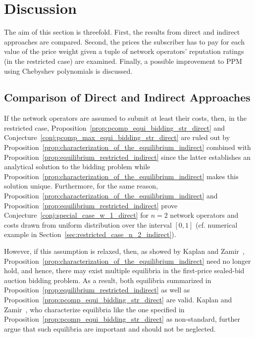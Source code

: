 
\section{Discussion} %
\label{sec:discussion_indirect}
The aim of this section is threefold. First, the results from direct and indirect approaches are compared. Second, the prices the subscriber has to pay for each value of the price weight given a tuple of network operators' reputation ratings (in the restricted case) are examined. Finally, a possible improvement to PPM using Chebyshev polynomials is discussed.

\subsection{Comparison of Direct and Indirect Approaches} %
\label{sub:comparison_of_direct_and_indirect_approaches_indirect}
If the network operators are assumed to submit at least their costs, then, in the restricted case, Proposition~\ref{prop:pcomp_equi_bidding_str_direct} and Conjecture~\ref{conj:pcomp_max_equi_bidding_str_direct} are ruled out by Proposition~\ref{prop:characterization_of_the_equilibrium_indirect} combined with Proposition~\ref{prop:equilibrium_restricted_indirect} since the latter establishes an analytical solution to the bidding problem while Proposition~\ref{prop:characterization_of_the_equilibrium_indirect} makes this solution unique. Furthermore, for the same reason, Proposition~\ref{prop:characterization_of_the_equilibrium_indirect} and Proposition~\ref{prop:equilibrium_restricted_indirect} prove Conjecture~\ref{conj:special_case_w_1_direct} for $n=2$ network operators and costs drawn from uniform distribution over the interval $[0,1]$ (cf. numerical example in Section~\ref{sec:restricted_case_n_2_indirect}).

However, if this assumption is relaxed, then, as showed by Kaplan and Zamir~\cite{KaplanZamir2011}, Proposition~\ref{prop:characterization_of_the_equilibrium_indirect} need no longer hold, and hence, there may exist multiple equilibria in the first-price sealed-bid auction bidding problem. As a result, both equilibria summarized in Proposition~\ref{prop:equilibrium_restricted_indirect} as well as Proposition~\ref{prop:pcomp_equi_bidding_str_direct} are valid. Kaplan and Zamir~\cite{KaplanZamir2011}, who characterize equilibria like the one specified in Proposition~\ref{prop:pcomp_equi_bidding_str_direct} as non-standard, further argue that such equilibria are important and should not be neglected.

